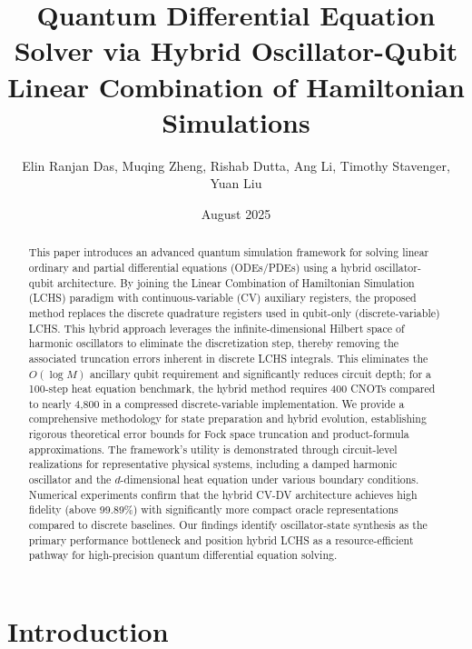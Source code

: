 \documentclass{article}
\title{Quantum Differential Equation Solver via Hybrid Oscillator-Qubit Linear Combination of Hamiltonian Simulations}
\author{Elin Ranjan Das, Muqing Zheng, Rishab Dutta, Ang Li, Timothy Stavenger, Yuan Liu}
\date{August 2025}
\begin{document}
\maketitle

\begin{abstract}
    This paper introduces an advanced quantum simulation framework for solving linear ordinary and partial differential equations (ODEs/PDEs) using a hybrid oscillator-qubit architecture. By joining the Linear Combination of Hamiltonian Simulation (LCHS) paradigm with continuous-variable (CV) auxiliary registers, the proposed method replaces the discrete quadrature registers used in qubit-only (discrete-variable) LCHS. This hybrid approach leverages the infinite-dimensional Hilbert space of harmonic oscillators to eliminate the discretization step, thereby removing the associated truncation errors inherent in discrete LCHS integrals. This eliminates the $O(\log M)$ ancillary qubit requirement and significantly reduces circuit depth; for a 100-step heat equation benchmark, the hybrid method requires 400 CNOTs compared to nearly 4,800 in a compressed discrete-variable implementation. We provide a comprehensive methodology for state preparation and hybrid evolution, establishing rigorous theoretical error bounds for Fock space truncation and product-formula approximations. The framework's utility is demonstrated through circuit-level realizations for representative physical systems, including a damped harmonic oscillator and the $d$-dimensional heat equation under various boundary conditions. Numerical experiments confirm that the hybrid CV-DV architecture achieves high fidelity (above 99.89\%) with significantly more compact oracle representations compared to discrete baselines. Our findings identify oscillator-state synthesis as the primary performance bottleneck and position hybrid LCHS as a resource-efficient pathway for high-precision quantum differential equation solving.
\end{abstract}






\tableofcontents



\section{Introduction}
\end{document}
